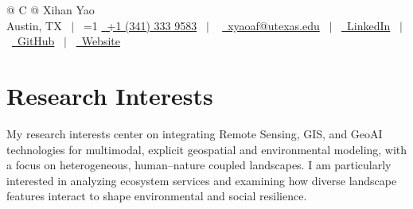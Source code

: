 \documentclass[a4paper,12pt]{article}
\providecommand{\PrivateBuild}{0}
\begin{document}
\pagestyle{empty}

\begin{tabularx}{\linewidth}{@{} C @{}}
{\Huge Xihan Yao } \\[6pt]

Austin, TX \ $|$ \
\ifnum\PrivateBuild=1
\href{tel:+13413339583}{\raisebox{-0.05\height}\faMobile\ +1 (341) 333 9583} \ $|$ \
\fi
\href{mailto:xyaoaf@utexas.edu}{\raisebox{-0.05\height}\faEnvelope\ xyaoaf@utexas.edu} \ $|$ \
\href{https://www.linkedin.com/in/xihan-yao-6381b3181/}{\raisebox{-0.05\height}\faLinkedin\ LinkedIn} \ $|$ \
\href{https://github.com/xyaoaf}{\raisebox{-0.05\height}\faGithub\ GitHub} \ $|$ \
\href{https://xyaoaf.github.io/}{\raisebox{-0.05\height}\faGlobe\ Website}

\end{tabularx}



\section{Research Interests}
My research interests center on integrating Remote Sensing, GIS, and GeoAI technologies for multimodal, explicit geospatial and environmental modeling, with a focus on heterogeneous, human–nature coupled landscapes. I am particularly interested in analyzing ecosystem services and examining how diverse landscape features interact to shape environmental and social resilience.

\end{document}
